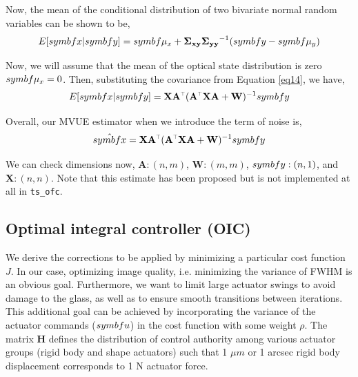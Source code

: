\documentclass[SE,authoryear,toc]{lsstdoc}
\renewcommand{\v}[1]{\mathbf{#1}}
\newcommand{\tr}{\scalebox{0.6}{$\top$}}
\begin{document}
Now, the mean of the conditional distribution of two bivariate normal random variables can be shown to be, 
\begin{equation}
    E[\\symbf{x} | \\symbf{y}] = \\symbf{\mu_x} + \v{\Sigma_{xy} } \v{\Sigma_{yy}}^{-1} (\\symbf{y} - \\symbf{\mu_y})
\end{equation}

Now, we will assume that the mean of the optical state distribution is zero $\\symbf{\mu_x} = 0$. Then, substituting the covariance from Equation \ref{eq14}, we have, 
\begin{equation}
    E[\\symbf{x} | \\symbf{y}] = \v{X}\v{A}^{\tr}(\v{A}^{\tr}\v{X}\v{A} + \v{W})^{-1} \\symbf{y}
\end{equation}

Overall, our MVUE estimator when we introduce the term of noise is, 
\begin{equation}
    \hat{\\symbf{x}} = \v{X}\v{A}^{\tr}(\v{A}^{\tr}\v{X}\v{A} + \v{W})^{-1} \\symbf{y}
\end{equation}

We can check dimensions now, $\v{A}: (n, m)$, $\v{W}: (m, m)$, $\\symbf{y}: (n, 1)$, and $\v{X}: (n, n)$. Note that this estimate has been proposed but is not implemented at all in \texttt{ts\_ofc}.



\subsection*{Optimal integral controller (OIC)}
We derive the corrections to be applied by minimizing a particular cost function $J$. In our case, optimizing image quality, i.e. minimizing the variance of FWHM is an obvious goal. Furthermore, we want to limit large actuator swings to avoid damage to the glass, as well as to ensure smooth transitions between iterations. This additional goal can be achieved by incorporating the variance of the actuator commands ($\\symbf{u}$) in the cost function with some weight $\rho$. The matrix $\v{H}$ defines the distribution of control authority among various actuator groups (rigid body and shape actuators) such that 1 $\mu m$ or 1 arcsec rigid body displacement corresponds to 1 N actuator force. 
\end{document}
